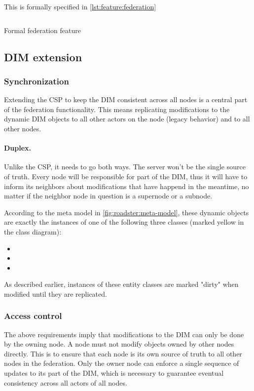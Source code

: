This is formally specified in \autoref{lst:feature:federation}

\begin{listing}
	\inputminted{Gherkin}{listings/features/federation/federation.feature}
	\caption{Formal federation feature}
	\label{lst:feature:federation}
\end{listing}

\subsection{DIM extension}

\subsubsection{Synchronization}
Extending the \gls{CSP} to keep the \gls{DIM} consistent across all nodes is a central
part of the federation functionality. This means replicating modifications to
the dynamic DIM objects to all other actors on the node (legacy behavior) and
to all other nodes.

\paragraph{Duplex.} Unlike the CSP, it needs to go both ways. The server won't
be the single source of truth. Every node will be responsible for part of the
DIM, thus it will have to inform its neighbors about modifications that have
happend in the meantime, no matter if the neighbor node in question is a
supernode or a subnode.

According to the meta model in \autoref{fig:roadster:meta-model}, these dynamic
objects are exactly the instances of one of the following three
classes (marked yellow in the class diagram):
\begin{itemize}
	\item {}
	\item {}
	\item {}
\end{itemize}

As described earlier, instances of these entity classes are marked "dirty" when
modified until they are replicated.

\subsubsection{Access control}
The above requirements imply that modifications to the \gls{DIM} can only be done by the
owning node. A node
must not modify objects owned by other nodes directly. This is to ensure that each node is its own source of truth
to all other nodes in the federation. Only the owner node can enforce a single
sequence of updates to its part of the DIM, which is necessary to guarantee
eventual consistency \cite[Chapter 5, Reliable Pub-Sub (Clone Pattern), Republishing
Updates from Clients]{zmq:zguide} across all actors of all nodes.

